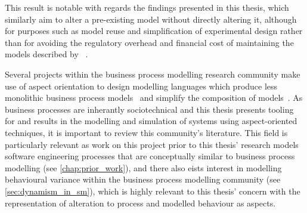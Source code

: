 This result is notable with regards the findings presented in this thesis, which
similarly aim to alter a pre-existing model without directly altering it,
although for purposes such as model reuse and simplification of experimental
design rather than for avoiding the regulatory overhead and financial cost of
maintaining the models described by
\citeauthor{ionescu2009aspect}~\cite{ionescu2009aspect}.







Several projects within the business process modelling research community make
use of aspect orientation to design modelling languages which produce less
monolithic business process models~\cite{Cappelli_AOBPM,da2020implementation}
and simplify the composition of models~\cite{charfi2007ao4bpel}. As business
processes are inherantly sociotechnical and this thesis presents tooling for and
results in the modelling and simulation of \sociotechnical systems using
aspect-oriented techniques, it is important to review this community's
literature. This field is particularly relevant as work on this project prior to
this thesis' research models software engineering processes that are
conceptually similar to business process modelling (see \cref{chap:prior_work}),
and there also eists interest in modelling behavioural variance within the
business process modelling community (see \cref{sec:dynamism_in_sm}), which is
highly relevant to this thesis' concern with the representation of alteration to
process and modelled behaviour as aspects.


